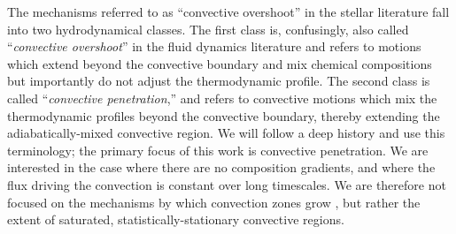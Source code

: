 \documentclass[twocolumn]{aastex631}
\begin{document}
The mechanisms referred to as ``convective overshoot'' in the stellar literature fall into two hydrodynamical classes.
The first class is, confusingly, also called ``\emph{convective overshoot}'' in the fluid dynamics literature and refers to motions which extend beyond the convective boundary and mix chemical compositions but importantly do not adjust the thermodynamic profile.
The second class is called ``\emph{convective penetration},'' and refers to convective motions which mix the thermodynamic profiles beyond the convective boundary, thereby extending the adiabatically-mixed convective region.
We will follow a deep history \citep{zahn1991, brummell_etal_2002, korre_etal_2019} and use this terminology; the primary focus of this work is convective penetration.
We are interested in the case where there are no composition gradients, and where the flux driving the convection is constant over long timescales.
We are therefore not focused on the mechanisms by which convection zones grow \citep[e.g., entrainment, ][]{meakin_arnett_2007, viallet_etal_2013, cristini_etal_2017, fuentes_cumming_2020, horst_etal_2021}, but rather the extent of saturated, statistically-stationary convective regions.
\end{document}

